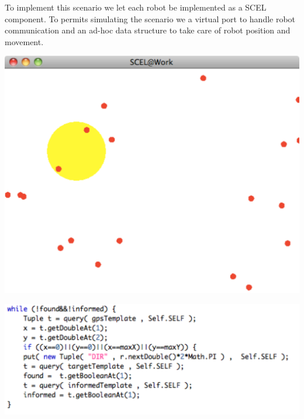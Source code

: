 \documentclass[11pt]{article}
\begin{document}
 To implement this scenario we let each robot be implemented as a SCEL component. To
 permits simulating the scenario we a virtual port to handle robot communication and
 an ad-hoc data structure to take care of robot position and movement.
 
\begin{center}
\includegraphics[scale=0.25]{img/scenariosimple}
\end{center}

\begin{center}
\includegraphics[scale=0.5]{img/pieceofcode}
\end{center}
\end{document}
